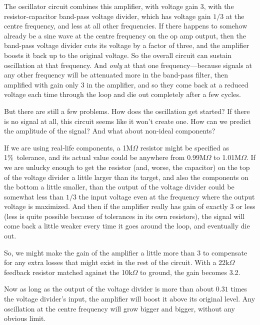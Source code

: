 The oscillator circuit combines this amplifier, with voltage gain 3, with
the resistor-capacitor band-pass voltage divider, which has voltage gain
$1/3$ at the centre frequency, and less at all other frequencies.  If there
happens to somehow already be a sine wave at the centre frequency on the op
amp output, then the band-pass voltage divider cuts its voltage by a factor
of three, and the amplifier boosts it back up to the original voltage.  So
the overall circuit can sustain oscillation at that frequency.  And
\emph{only} at that one frequency---because signals at any other frequency
will be attenuated more in the band-pass filter, then amplified with gain
only 3 in the amplifier, and so they come back at a reduced voltage each
time through the loop and die out completely after a few cycles.

But there are still a few problems.  How does the oscillation get started? 
If there is no signal at all, this circuit seems like it won't create one. 
How can we predict the amplitude of the signal?  And what about non-ideal
components?

If we are using real-life components, a 1M$\Omega$ resistor might be
specified as 1\%\ tolerance, and its actual value could be anywhere from
0.99M$\Omega$ to 1.01M$\Omega$.  If we are unlucky enough to get the
resistor (and, worse, the capacitor) on the top of the voltage divider a
little larger than its target, and also the components on the bottom a
little smaller, than the output of the voltage divider could be somewhat
less than $1/3$ the input voltage even at the frequency where the output
voltage is maximized.  And then if the amplifier really has gain of exactly
3 or less (less is quite possible because of tolerances in its own
resistors), the signal will come back a little weaker every time it goes
around the loop, and eventually die out.

So, we might make the gain of the amplifier a little more than 3 to
compensate for any extra losses that might exist in the rest of the circuit. 
With a 22k$\Omega$ feedback resistor matched against the 10k$\Omega$ to
ground, the gain becomes 3.2.

{\centering\par}

Now as long as the output of the voltage divider is more than about $0.31$
times the voltage divider's input, the amplifier will boost it above its
original level.  Any oscillation at the centre frequency will grow bigger
and bigger, without any obvious limit.

